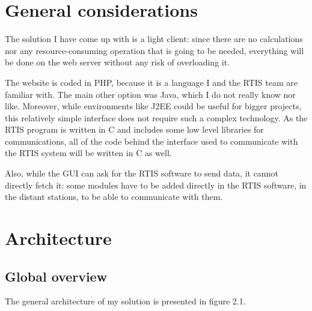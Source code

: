\documentclass{themeensg}
\begin{document}
\section{General considerations}

The solution I have come up with is a light client: since there are no calculations nor any resource-consuming operation that is going to be needed, everything will be done on the web server without any risk of overloading it.

The website is coded in PHP, because it is a language I and the RTIS team are familiar with. The main other option was Java, which I do not really know nor like. Moreover, while environments like J2EE could be useful for bigger projects, this relatively simple interface does not require such a complex technology.
As the RTIS program is written in C and includes some low level libraries for communications, all of the code behind the interface used to communicate with the RTIS system will be written in C as well.

Also, while the GUI can ask for the RTIS software to send data, it cannot directly fetch it: some modules have to be added directly in the RTIS software, in the distant stations, to be able to communicate with them.

\section{Architecture}
\subsection{Global overview}

The general architecture of my solution is presented in figure 2.1.
\end{document}
